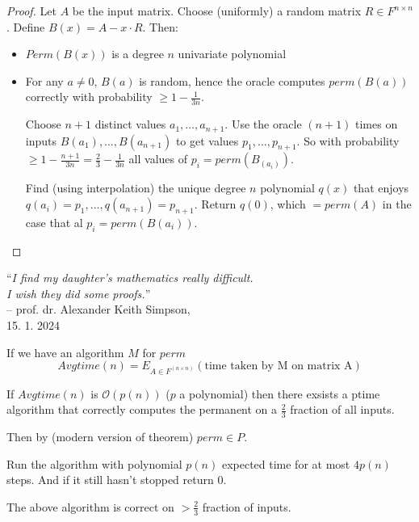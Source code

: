 \documentclass[a4paper,12pt]{article}
\theoremstyle{definition}
\theoremstyle{remark}
\begin{document}
\begin{proof}
    Let $A$ be the input matrix. Choose (uniformly) a random matrix $R \in F^{n \times n}$.
    Define $B(x) = A - x \cdot R$. Then:
    \begin{itemize}
        \item $Perm(B(x))$ is a degree $n$ univariate polynomial
        \item For any $a \neq 0$, $B(a)$ is random, hence the oracle computes $perm(B(a))$ 
        correctly with probability $\geq 1 - \frac{1}{3n}$.

        Choose $n + 1$ distinct values $a_1, \dots, a_{n + 1}$. Use the oracle $(n + 1)$ times on inputs $B(a_1), \dots, B(a_{n+1})$
        to get values $p_1, \dots, p_{n+1}$. So with probability $\geq 1 - \frac{n + 1}{3n} = \frac{2}{3} - \frac{1}{3n}$ all values
        of $p_i = perm(B_(a_i))$.

        Find (using interpolation) the unique degree $n$ polynomial $q(x)$ that enjoys $q(a_i) = p_1, \dots, q(a_{n + 1}) = p_{n + 1}$.
        Return $q(0)$, which $= perm(A)$ in the case that al $p_i = perm(B(a_i))$.
    \end{itemize}
\end{proof}

\begin{center}
    \enquote{\textit{I find my daughter's mathematics really difficult. \\
    I wish they did some proofs.}}\\ 
    \hfill -- prof. dr. Alexander Keith Simpson, \\
    \hfill 15. 1. 2024
\end{center}


If we have an algorithm $M$ for $perm$
\begin{equation*}
    Avgtime(n) = E_{A \in F^{(n \times n)}} (\text{time taken by M on matrix A})
\end{equation*}

If $Avgtime(n)$ is $\mathscr{O}(p(n))$ ($p$ a polynomial) then there exsists a ptime 
algorithm that correctly computes the permanent on a $\frac{2}{3}$ fraction of all inputs. 

Then by (modern version of theorem) $perm \in P$.

Run the algorithm with polynomial $p(n)$ expected time for at most $4 p(n)$ steps. 
And if it still hasn't stopped return 0.

The above algorithm is correct on $> \frac{2}{3}$ fraction of inputs.
\end{document}
